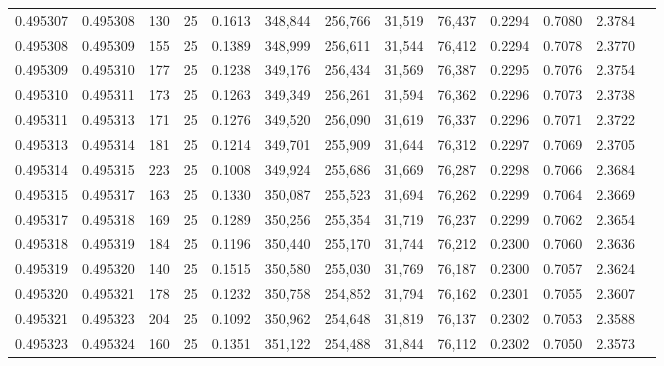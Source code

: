 \begin{tabular}{rrrrrrrrrrrrr}
0.495307 & 0.495308 &   130 &  25 &                                     0.1613 & 348,844 & 256,766 &  31,519 &  76,437 & 0.2294 & 0.7080 & 2.3784 \\
0.495308 & 0.495309 &   155 &  25 &                                     0.1389 & 348,999 & 256,611 &  31,544 &  76,412 & 0.2294 & 0.7078 & 2.3770 \\
0.495309 & 0.495310 &   177 &  25 &                                     0.1238 & 349,176 & 256,434 &  31,569 &  76,387 & 0.2295 & 0.7076 & 2.3754 \\
0.495310 & 0.495311 &   173 &  25 &                                     0.1263 & 349,349 & 256,261 &  31,594 &  76,362 & 0.2296 & 0.7073 & 2.3738 \\
0.495311 & 0.495313 &   171 &  25 &                                     0.1276 & 349,520 & 256,090 &  31,619 &  76,337 & 0.2296 & 0.7071 & 2.3722 \\
0.495313 & 0.495314 &   181 &  25 &                                     0.1214 & 349,701 & 255,909 &  31,644 &  76,312 & 0.2297 & 0.7069 & 2.3705 \\
0.495314 & 0.495315 &   223 &  25 &                                     0.1008 & 349,924 & 255,686 &  31,669 &  76,287 & 0.2298 & 0.7066 & 2.3684 \\
0.495315 & 0.495317 &   163 &  25 &                                     0.1330 & 350,087 & 255,523 &  31,694 &  76,262 & 0.2299 & 0.7064 & 2.3669 \\
0.495317 & 0.495318 &   169 &  25 &                                     0.1289 & 350,256 & 255,354 &  31,719 &  76,237 & 0.2299 & 0.7062 & 2.3654 \\
0.495318 & 0.495319 &   184 &  25 &                                     0.1196 & 350,440 & 255,170 &  31,744 &  76,212 & 0.2300 & 0.7060 & 2.3636 \\
0.495319 & 0.495320 &   140 &  25 &                                     0.1515 & 350,580 & 255,030 &  31,769 &  76,187 & 0.2300 & 0.7057 & 2.3624 \\
0.495320 & 0.495321 &   178 &  25 &                                     0.1232 & 350,758 & 254,852 &  31,794 &  76,162 & 0.2301 & 0.7055 & 2.3607 \\
0.495321 & 0.495323 &   204 &  25 &                                     0.1092 & 350,962 & 254,648 &  31,819 &  76,137 & 0.2302 & 0.7053 & 2.3588 \\
0.495323 & 0.495324 &   160 &  25 &                                     0.1351 & 351,122 & 254,488 &  31,844 &  76,112 & 0.2302 & 0.7050 & 2.3573 \\

\end{tabular}
